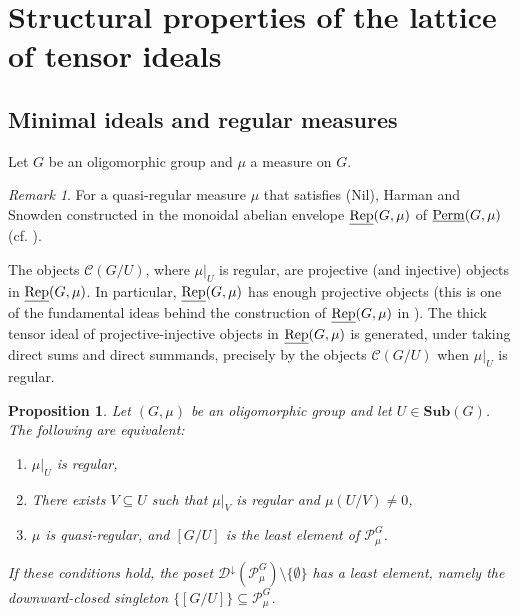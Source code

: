 \documentclass[11pt,a4paper]{amsart}
\theoremstyle{plain}%
\newtheorem{proposition}[lemma]{Proposition}
\theoremstyle{definition}
\theoremstyle{remark}
\newtheorem{remark}[lemma]{Remark}
\newcommand{\uRep}{\underline{{\rm Rep}}}
\newcommand{\Perm}{\underline{{\rm Perm}}}
\newcommand{\Down}{\mathcal{D}^{\downarrow}}
\newcommand{\Sub}{\mathbf{Sub}}
\begin{document}





\section{Structural properties of the lattice of tensor ideals}
\subsection{Minimal ideals and regular measures}
Let $G$ be an oligomorphic group and $\mu$ a measure on $G$. 



\begin{remark}
    For a quasi-regular measure $\mu$ that satisfies (Nil), Harman and Snowden constructed in \cite[§3.4]{HS-classical} the monoidal abelian envelope $\uRep(G, \mu)$ of $\Perm(G, \mu)$ (cf. \cite{HS-oligomorphic}).

    The objects $\mathcal{C}(G/U)$, where $\mu\rvert_U$ is regular, are projective (and injective) objects in $\uRep(G,\mu)$. In particular, $\uRep(G,\mu)$ has enough projective objects (this is one of the fundamental ideas behind the construction of $\uRep(G, \mu)$ in \cite{HS-oligomorphic}). The thick tensor ideal of projective-injective objects in $\uRep(G,\mu)$ is generated, under taking direct sums and direct summands, precisely by the objects $\mathcal{C}(G/U)$ when $\mu\rvert_U$ is regular. 
\end{remark}



\begin{proposition}\label{prop:quasiregular}
Let $(G, \mu)$ be an oligomorphic group and let $U\in \Sub(G)$. The following are equivalent:
 
 \begin{enumerate}
    \item $\mu\rvert_U$ is regular,
        \item There exists $V\subseteq U$ such that $\mu\rvert_V$ is regular and $\mu(U/V)\neq 0$, 
     \item $\mu$ is quasi-regular, and $[G/U]$ is the least element of $\mathcal{P}_{\mu}^G$.
 
 \end{enumerate}
If these conditions hold, the poset ${\Down(\mathcal{P}_{\mu}^G)}\setminus \{\emptyset\}$ has a least element, namely the downward-closed singleton $\{[G/U]\}\subseteq \mathcal{P}_{\mu}^G$. 

\end{proposition}
\end{document}
